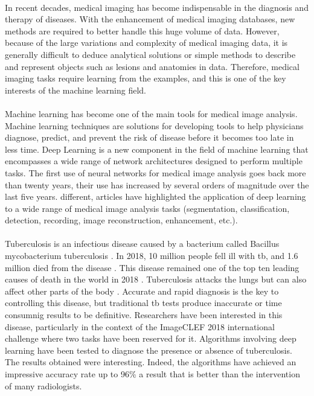 \paragraph{}
In recent decades, medical imaging has become indispensable in the diagnosis and therapy of diseases. With the enhancement of medical imaging databases, new methods are required to better handle this huge volume of data. However, because of the large variations and complexity of medical imaging data, it is generally difficult to deduce analytical solutions or simple methods to describe and represent objects such as lesions and anatomies in data. Therefore, medical imaging tasks require learning from the examples, and this is one of the key interests of the machine learning field.
\paragraph{}
Machine learning has become one of the main tools for medical image analysis. Machine learning techniques are solutions for developing tools to help physicians diagnose, predict, and prevent the risk of disease before it becomes too late in less time. Deep Learning is a new component in the field of machine learning that encompasses a wide range of network architectures designed to perform multiple tasks. The first use of neural networks for medical image analysis goes back more than twenty years, their use has increased by several orders of magnitude over the last five years. different, articles \cite{NNMEEX:1,NNMEEX:2,NNMEEX:3,NNMEEX:4,NNMEEX:5} have highlighted the application of deep learning to a wide range of medical image analysis tasks (segmentation, classification, detection, recording, image reconstruction, enhancement, etc.).
\paragraph{}
Tuberculosis is an infectious disease caused by a bacterium called Bacillus mycobacterium tuberculosis \cite{TBT:1}. In 2018, 10 million people fell ill with \ac{tb}, and 1.6 million died from the disease \cite{TBT:1}. This disease remained one of the top ten leading causes of death in the world in 2018 \cite{TBT:1}. Tuberculosis attacks the lungs but can also affect other parts of the body \cite{TBT:2}. Accurate and rapid diagnosis is the key to controlling this disease, but traditional \ac{tb} tests produce inaccurate or time consumnig results to be definitive. Researchers have been interested in this disease, particularly in the context of the ImageCLEF 2018\cite{ImageCLEF:1} international challenge \cite{ImageCLEF:1} where two tasks have been reserved for it. Algorithms involving deep learning have been tested to diagnose the presence or absence of tuberculosis. The results obtained were interesting. Indeed, the algorithms have achieved an impressive accuracy rate up to 96\% \cite{NNMEEX:6,NNMEEX:7} a result that is better than the intervention of many radiologists.
